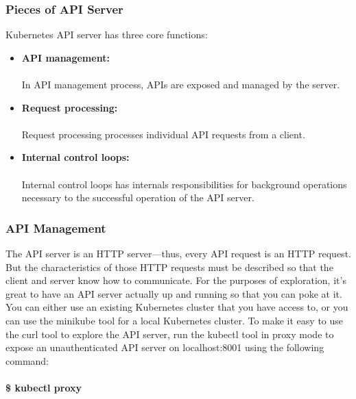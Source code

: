 \documentclass[12pt]{report}
\begin{document}
\subsubsection{Pieces of API Server}
Kubernetes API server has three core functions:
\begin{itemize}
	\item \textbf{API management:}\\\\
	In API management process, APIs are exposed and managed by the server.
	\item \textbf{Request processing:}\\\\
	Request processing processes individual API requests from a client.
	\item \textbf{Internal control loops:}\\\\
	Internal control loops has internals responsibilities for background operations necessary to the successful operation of the API server.
\end{itemize}
\subsubsection{API Management \cite{KubernetesManagement}}
The API server is an HTTP server—thus, every API request is an HTTP request. But the characteristics of those HTTP requests must be described so that the client and server know how to communicate. For the purposes of exploration, it’s great to have an API server actually up and running so that you can poke at it. You can either use an existing Kubernetes cluster that you have access to, or you can use the minikube tool for a local Kubernetes cluster. To make it easy to use the curl tool to explore the API server, run the kubectl tool in proxy mode to expose an unauthenticated API server on localhost:8001 using the following command:\\\\
\textbf{\$ kubectl proxy}
\end{document}

